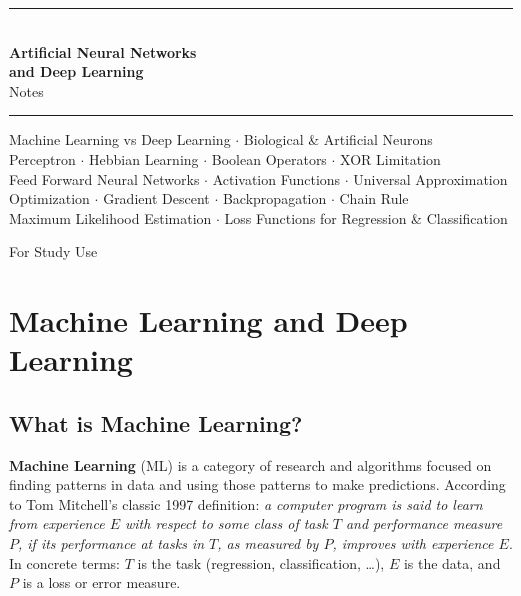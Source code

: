 \documentclass[11pt,a4paper]{article}
\newcommand{\term}[1]{\textcolor{DefGreen}{\textbf{#1}}}
\begin{document}

\begin{titlepage}
\centering\vspace*{3cm}
{\color{PrimaryBlue}\rule{\linewidth}{2pt}}\\[0.6em]
{\Huge\bfseries\color{PrimaryBlue} Artificial Neural Networks}\\[0.3em]
{\Huge\bfseries\color{PrimaryBlue} and Deep Learning}\\[0.4em]
{\Large\color{SubsectionColor} Notes}\\[0.3em]
{\color{PrimaryBlue}\rule{\linewidth}{2pt}}\vspace{1.5cm}
\begin{tcolorbox}[colback=LightBlue,colframe=AccentBlue,width=0.85\textwidth,boxrule=1pt,arc=4pt]
\centering\normalsize\color{NoteGray}
Machine Learning vs Deep Learning $\cdot$ Biological \& Artificial Neurons\\
Perceptron $\cdot$ Hebbian Learning $\cdot$ Boolean Operators $\cdot$ XOR Limitation\\
Feed Forward Neural Networks $\cdot$ Activation Functions $\cdot$ Universal Approximation\\
Optimization $\cdot$ Gradient Descent $\cdot$ Backpropagation $\cdot$ Chain Rule\\
Maximum Likelihood Estimation $\cdot$ Loss Functions for Regression \& Classification
\end{tcolorbox}
\vfill{\color{NoteGray}\small For Study Use}
\end{titlepage}

\tableofcontents\newpage

\section{Machine Learning and Deep Learning}

\subsection{What is Machine Learning?}

\term{Machine Learning} (ML) is a category of research and algorithms focused on finding patterns in data and using those patterns to make predictions. According to Tom Mitchell's classic 1997 definition: \emph{a computer program is said to learn from experience $E$ with respect to some class of task $T$ and performance measure $P$, if its performance at tasks in $T$, as measured by $P$, improves with experience $E$}. In concrete terms: $T$ is the task (regression, classification, \ldots), $E$ is the data, and $P$ is a loss or error measure.
\end{document}
